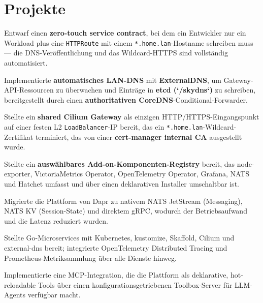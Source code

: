 \documentclass[10pt,a4paper]{resume}
\begin{document}
\vspace{2pt}

\section{Projekte}

\bullets
  \item Entwarf einen \textbf{zero-touch service contract}, bei dem ein Entwickler nur ein Workload plus eine \texttt{HTTPRoute} mit einem \texttt{*.home.lan}-Hostname schreiben muss — die DNS-Veröffentlichung und das Wildcard-HTTPS sind vollständig automatisiert.
  \item Implementierte \textbf{automatisches LAN-DNS} mit \textbf{ExternalDNS}, um Gateway-API-Ressourcen zu überwachen und Einträge in \textbf{etcd (`/skydns`)} zu schreiben, bereitgestellt durch einen \textbf{authoritativen CoreDNS}-Conditional-Forwarder.
  \item Stellte ein \textbf{shared Cilium Gateway} als einzigen HTTP/HTTPS-Eingangspunkt auf einer festen L2 \texttt{LoadBalancer}-IP bereit, das ein \texttt{*.home.lan}-Wildcard-Zertifikat terminiert, das von einer \textbf{cert-manager internal CA} ausgestellt wurde.
  \item Stellte ein \textbf{auswählbares Add-on-Komponenten-Registry} bereit, das node-exporter, VictoriaMetrics Operator, OpenTelemetry Operator, Grafana, NATS und Hatchet umfasst und über einen deklarativen Installer umschaltbar ist.
\bulletsend
\vspace{1.0pt}
\bullets
  \item Migrierte die Plattform von Dapr zu nativem NATS JetStream (Messaging), NATS KV (Session-State) und direktem gRPC, wodurch der Betriebsaufwand und die Latenz reduziert wurden.
  \item Stellte Go-Microservices mit Kubernetes, kustomize, Skaffold, Cilium und external-dns bereit; integrierte OpenTelemetry Distributed Tracing und Prometheus-Metriksammlung über alle Dienste hinweg.
  \item Implementierte eine MCP-Integration, die die Plattform als deklarative, hot-reloadable Tools über einen konfigurationsgetriebenen Toolbox-Server für LLM-Agents verfügbar macht.
\bulletsend
\end{document}
